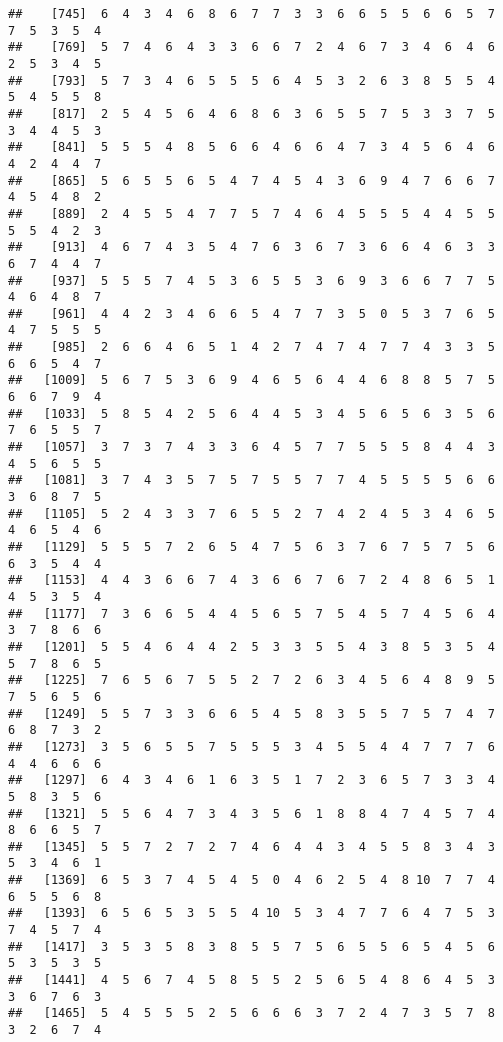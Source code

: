 \documentclass[
]{book}
\begin{document}
\begin{verbatim}
##    [745]  6  4  3  4  6  8  6  7  7  3  3  6  6  5  5  6  6  5  7  7  5  3  5  4
##    [769]  5  7  4  6  4  3  3  6  6  7  2  4  6  7  3  4  6  4  6  2  5  3  4  5
##    [793]  5  7  3  4  6  5  5  5  6  4  5  3  2  6  3  8  5  5  4  5  4  5  5  8
##    [817]  2  5  4  5  6  4  6  8  6  3  6  5  5  7  5  3  3  7  5  3  4  4  5  3
##    [841]  5  5  5  4  8  5  6  6  4  6  6  4  7  3  4  5  6  4  6  4  2  4  4  7
##    [865]  5  6  5  5  6  5  4  7  4  5  4  3  6  9  4  7  6  6  7  4  5  4  8  2
##    [889]  2  4  5  5  4  7  7  5  7  4  6  4  5  5  5  4  4  5  5  5  5  4  2  3
##    [913]  4  6  7  4  3  5  4  7  6  3  6  7  3  6  6  4  6  3  3  6  7  4  4  7
##    [937]  5  5  5  7  4  5  3  6  5  5  3  6  9  3  6  6  7  7  5  4  6  4  8  7
##    [961]  4  4  2  3  4  6  6  5  4  7  7  3  5  0  5  3  7  6  5  4  7  5  5  5
##    [985]  2  6  6  4  6  5  1  4  2  7  4  7  4  7  7  4  3  3  5  6  6  5  4  7
##   [1009]  5  6  7  5  3  6  9  4  6  5  6  4  4  6  8  8  5  7  5  6  6  7  9  4
##   [1033]  5  8  5  4  2  5  6  4  4  5  3  4  5  6  5  6  3  5  6  7  6  5  5  7
##   [1057]  3  7  3  7  4  3  3  6  4  5  7  7  5  5  5  8  4  4  3  4  5  6  5  5
##   [1081]  3  7  4  3  5  7  5  7  5  5  7  7  4  5  5  5  5  6  6  3  6  8  7  5
##   [1105]  5  2  4  3  3  7  6  5  5  2  7  4  2  4  5  3  4  6  5  4  6  5  4  6
##   [1129]  5  5  5  7  2  6  5  4  7  5  6  3  7  6  7  5  7  5  6  6  3  5  4  4
##   [1153]  4  4  3  6  6  7  4  3  6  6  7  6  7  2  4  8  6  5  1  4  5  3  5  4
##   [1177]  7  3  6  6  5  4  4  5  6  5  7  5  4  5  7  4  5  6  4  3  7  8  6  6
##   [1201]  5  5  4  6  4  4  2  5  3  3  5  5  4  3  8  5  3  5  4  5  7  8  6  5
##   [1225]  7  6  5  6  7  5  5  2  7  2  6  3  4  5  6  4  8  9  5  7  5  6  5  6
##   [1249]  5  5  7  3  3  6  6  5  4  5  8  3  5  5  7  5  7  4  7  6  8  7  3  2
##   [1273]  3  5  6  5  5  7  5  5  5  3  4  5  5  4  4  7  7  7  6  4  4  6  6  6
##   [1297]  6  4  3  4  6  1  6  3  5  1  7  2  3  6  5  7  3  3  4  5  8  3  5  6
##   [1321]  5  5  6  4  7  3  4  3  5  6  1  8  8  4  7  4  5  7  4  8  6  6  5  7
##   [1345]  5  5  7  2  7  2  7  4  6  4  4  3  4  5  5  8  3  4  3  5  3  4  6  1
##   [1369]  6  5  3  7  4  5  4  5  0  4  6  2  5  4  8 10  7  7  4  6  5  5  6  8
##   [1393]  6  5  6  5  3  5  5  4 10  5  3  4  7  7  6  4  7  5  3  7  4  5  7  4
##   [1417]  3  5  3  5  8  3  8  5  5  7  5  6  5  5  6  5  4  5  6  5  3  5  3  5
##   [1441]  4  5  6  7  4  5  8  5  5  2  5  6  5  4  8  6  4  5  3  3  6  7  6  3
##   [1465]  5  4  5  5  5  2  5  6  6  6  3  7  2  4  7  3  5  7  8  3  2  6  7  4

\end{verbatim}
\end{document}
